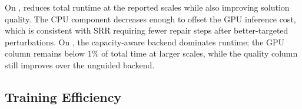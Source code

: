 \begin{table}[h]
\centering
\caption{Time breakdown (CPU vs.\ GPU) and quality for unguided ACO vs.\ \DyNACS{} at $I_{10000}$.}
\label{tab:time-breakdown}
\small
\renewcommand{\arraystretch}{0.80}
\end{table}


On \TSP{}, \DyNACS{} reduces total runtime at the reported scales while also improving solution quality. The CPU component decreases enough to offset the GPU inference cost, which is consistent with SRR requiring fewer repair steps after better-targeted perturbations. On \CVRP{}, the capacity-aware backend dominates runtime; the GPU column remains below 1\% of total time at larger scales, while the quality column still improves over the unguided backend.

\subsection{Training Efficiency}
\label{sec:training-efficiency}

